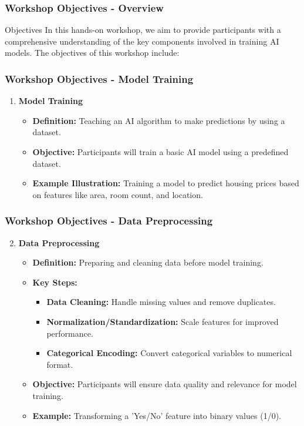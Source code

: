 \documentclass{beamer}
\begin{document}
\begin{frame}[fragile]
    \frametitle{Workshop Objectives - Overview}
    \begin{block}{Objectives}
        In this hands-on workshop, we aim to provide participants with a comprehensive understanding of the key components involved in training AI models. The objectives of this workshop include:
    \end{block}
\end{frame}

\begin{frame}[fragile]
    \frametitle{Workshop Objectives - Model Training}
    \begin{enumerate}
        \item \textbf{Model Training}
            \begin{itemize}
                \item \textbf{Definition:} Teaching an AI algorithm to make predictions by using a dataset.
                \item \textbf{Objective:} Participants will train a basic AI model using a predefined dataset.
                \item \textbf{Example Illustration:} Training a model to predict housing prices based on features like area, room count, and location.
            \end{itemize}
    \end{enumerate}
\end{frame}

\begin{frame}[fragile]
    \frametitle{Workshop Objectives - Data Preprocessing}
    \begin{enumerate}
        \setcounter{enumi}{1}
        \item \textbf{Data Preprocessing}
            \begin{itemize}
                \item \textbf{Definition:} Preparing and cleaning data before model training.
                \item \textbf{Key Steps:}
                    \begin{itemize}
                        \item \textbf{Data Cleaning:} Handle missing values and remove duplicates.
                        \item \textbf{Normalization/Standardization:} Scale features for improved performance.
                        \item \textbf{Categorical Encoding:} Convert categorical variables to numerical format.
                    \end{itemize}
                \item \textbf{Objective:} Participants will ensure data quality and relevance for model training.
                \item \textbf{Example:} Transforming a 'Yes/No' feature into binary values (1/0).
            \end{itemize}
    \end{enumerate}
\end{frame}
\end{document}
